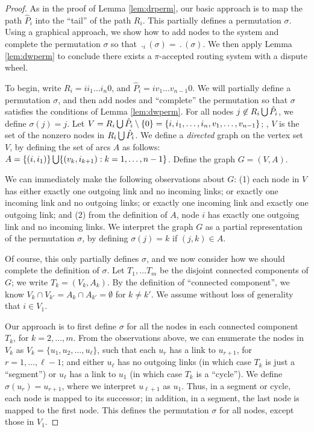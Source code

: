 \begin{proof}
As in the proof of Lemma \ref{lem:drperm}, our basic
approach is to map the path $\hat{P}_i$ into the ``tail'' of the path
$R_i$.  This partially defines a permutation $\sigma$.  Using a graphical
approach, we show how to add nodes to the system and
complete the 
permutation $\sigma$ so that $\period_i(\sigma) = \period(\sigma)$.
We then apply Lemma \ref{lem:dwperm} to conclude
there exists a $\pi$-accepted routing system with a dispute wheel.

To begin, write $R_i = i i_1 \ldots i_n
0$, and $\hat{P}_i = i v_1
\ldots v_{n-1} 0$.  We will partially define a permutation $\sigma$,
and then add nodes and ``complete'' the permutation so that $\sigma$
satisfies the conditions of Lemma \ref{lem:dwperm}.  For all
nodes $j \not\in R_i \bigcup \hat{P}_i$, we define $\sigma(j) = j$.
Let $V = R_i \bigcup \hat{P}_i \setminus \{ 0\} = \{ i, i_1, \ldots, i_n, v_1, \ldots,
v_{n-1}\}$; \ie, $V$ is the set of the nonzero nodes in $R_i \bigcup \hat{P}_i$.  We
define a {\em directed} graph on the vertex set $V$, by defining the set of arcs $A$
as follows: $A = \{ (i, i_1)\} \bigcup \{ (v_k, i_{k+1}) : k = 1,\ldots,n-1
\}$.  Define the graph $G = (V,A)$.

We can immediately make the following observations about $G$: (1) each
node in $V$ has either exactly one outgoing link and no incoming
links; or exactly one incoming link and no outgoing links; or exactly
one incoming link and exactly one outgoing link; and (2) from the
definition of $A$, node $i$ has exactly one outgoing link and no
incoming links.  We interpret the graph $G$ as a partial
representation of the permutation $\sigma$, by defining $\sigma(j) =
k$ if $(j,k) \in A$.

Of course, this only partially defines $\sigma$, and we now consider
how we should complete the definition of $\sigma$.  Let $T_1, \ldots T_m$ be the
disjoint connected components of $G$; we write $T_k = (V_k, A_k)$.  By
the definition of ``connected component'', we know $V_k \cap V_{k'} = A_k \cap A_{k'} =
\emptyset$ for $k \neq k'$.  We assume without loss of generality that
$i \in V_1$.

Our approach is to first define $\sigma$ for all the nodes in each
connected component $T_k$, for $k = 2,\ldots,m$.  From the
observations above, we can enumerate the nodes in $V_k$ as $V_k = \{
u_1, u_2, \ldots, u_\ell\}$, such that each $u_r$ has a link to 
$u_{r+1}$, for $r = 1,\ldots,\ell-1$; and either $u_\ell$ has no
outgoing links (in which case $T_k$ is just a ``segment'') or $u_\ell$ has
a link to $u_1$ (in which case $T_k$ is a ``cycle'').  We define
$\sigma(u_r) = u_{r+1}$, where we interpret $u_{\ell+1}$ as $u_1$.  Thus, in a
segment or cycle, each node is mapped to its successor; in addition, in a
segment, the last node is mapped to the first node.  This defines the
permutation $\sigma$ for all nodes, except those in $V_1$.


\end{proof}
